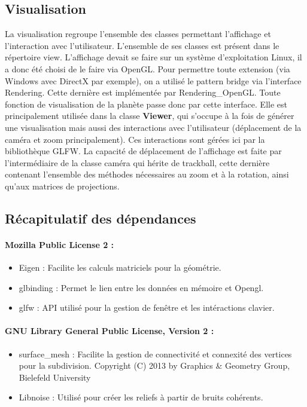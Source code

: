 \documentclass[a4paper]{article}
\begin{document}
\subsection{Visualisation}


La visualisation regroupe l'ensemble des classes permettant l'affichage et l'interaction avec l'utilisateur. L'ensemble de ses classes est présent dans le répertoire view.
L'affichage devait se faire sur un système d'exploitation Linux, il a donc été choisi de le faire via OpenGL. Pour permettre toute extension (via Windows avec DirectX par exemple), on a utilisé le pattern bridge via l'interface Rendering. Cette dernière est implémentée par Rendering\_OpenGL. Toute fonction de visualisation de la planète passe donc par cette interface. Elle est principalement utilisée dans la classe \textbf{Viewer}, qui s'occupe à la fois de générer une visualisation mais aussi des interactions avec l'utilisateur (déplacement de la caméra et zoom principalement). Ces interactions sont gérées ici par la bibliothèque GLFW.
La capacité de déplacement de l'affichage est faite par l'intermédiaire de la classe caméra qui hérite de trackball, cette dernière contenant l'ensemble des méthodes nécessaires au zoom et à la rotation, ainsi qu'aux matrices de projections.

\subsection{Récapitulatif des dépendances}

\paragraph{Mozilla Public License 2 : }
\begin{itemize}
\item Eigen :  
     Facilite les calculs matriciels pour la géométrie. 
 \item glbinding :  
     Permet le lien entre les données en mémoire et Opengl.
\item glfw : 
     API utilisé pour la gestion de fenêtre et les intéractions clavier.
\end{itemize}

\paragraph{GNU Library General Public License, Version 2 : }
\begin{itemize}
\item surface\_mesh :
    Facilite la gestion de connectivité et connexité des vertices pour la subdivision. Copyright (C) 2013 by Graphics \& Geometry Group, Bielefeld University
\item Libnoise :
    Utilisé pour créer les reliefs à partir de bruits cohérents.
\end{itemize}
\end{document}
